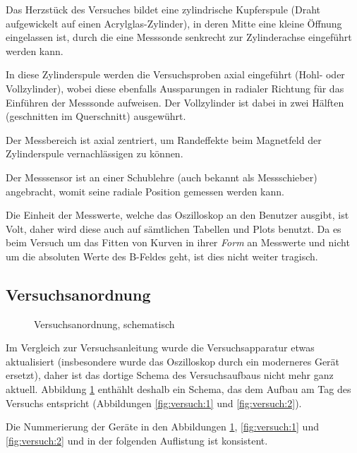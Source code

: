 Das  Herzst\"uck des  Versuches  bildet eine  zylindrische Kupferspule  (Draht
aufgewickelt  auf  einen  Acrylglas-Zylinder),  in  deren  Mitte  eine  kleine
\"Offnung   eingelassen  ist,   durch   die  eine   Messsonde  senkrecht   zur
Zylinderachse eingef\"uhrt werden kann.

In  diese Zylinderspule  werden die  Versuchsproben axial  eingef\"uhrt (Hohl-
oder Vollzylinder),  wobei diese  ebenfalls Aussparungen in  radialer Richtung
f\"ur das Einf\"uhren  der Messsonde aufweisen. Der Vollzylinder  ist dabei in
zwei H\"alften (geschnitten im Querschnitt) ausgew\"uhrt.

Der  Messbereich  ist axial  zentriert,  um  Randeffekte beim  Magnetfeld  der
Zylinderspule vernachl\"assigen zu k\"onnen.

Der  Messsensor  ist  an  einer Schublehre  (auch  bekannt  als  Messschieber)
angebracht, womit seine radiale Position gemessen werden kann.

Die Einheit der Messwerte, welche das Oszilloskop an den Benutzer ausgibt, ist
Volt, daher wird diese auch auf s\"amtlichen Tabellen und Plots benutzt. Da es
beim Versuch  um das Fitten von  Kurven in ihrer \emph{Form}  an Messwerte und
nicht  um  die absoluten  Werte  des  B-Feldes  geht,  ist dies  nicht  weiter
tragisch.


\subsection{Versuchsanordnung}
\label{sec:durchf:subsec:anordn}

\begin{figure}[!htb]
    \resizebox{\textwidth}{!}{}
    \caption{Versuchsanordnung, schematisch}
    \label{fig:versuch:schematic}
\end{figure}

Im  Vergleich   zur  Versuchsanleitung   wurde  die   Versuchsapparatur  etwas
aktualisiert (insbesondere wurde das  Oszilloskop durch ein moderneres Ger\"at
ersetzt), daher  ist das  dortige Schema des  Versuchsaufbaus nicht  mehr ganz
aktuell. Abbildung \ref{fig:versuch:schematic} enth\"ahlt  deshalb ein Schema,
das dem Aufbau am Tag des Versuchs entspricht (Abbildungen \ref{fig:versuch:1}
und \ref{fig:versuch:2}).

Die Nummerierung der Ger\"ate  in den Abbildungen \ref{fig:versuch:schematic},
\ref{fig:versuch:1} und  \ref{fig:versuch:2} und  in der  folgenden Auflistung
ist konsistent.

